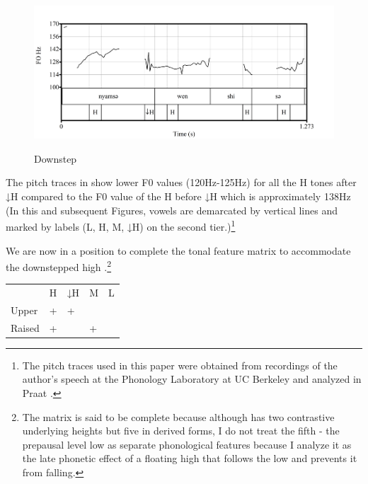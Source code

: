 \documentclass[output=paper,modfonts,nonflat,
 hidelinks
]{langsci/langscibook}
\begin{document}
\ea\label{ex:akumbu:20}
\z

\begin{figure}[t]
	{\includegraphics[width=\textwidth]{figures/fig-akumbu-1}}
	\caption{Downstep}\label{fig:akumbu:1}	
\end{figure}

\largerpage[-1]
The pitch traces in  show lower F0 values (120Hz-125Hz) for all the H tones after ↓H compared to the F0 value of the H  before ↓H which is approximately 138Hz (In this and subsequent Figures, vowels are demarcated by vertical lines and marked by  labels (L, H, M, ↓H) on the second tier.)\footnote{The pitch traces used in this paper were obtained from recordings of the author’s speech at the Phonology Laboratory at UC Berkeley and analyzed in Praat \citep{Boersma2016}.}


We are now in a position to complete the tonal feature matrix to accommodate the downstepped high .\footnote{The matrix is said to be complete because although  has two contrastive underlying  heights but five in derived forms, I do not treat the fifth - the prepausal level low  as separate phonological  features because I analyze it as the late phonetic effect of a floating high  that follows the low  and prevents it from falling.} 

\ea\label{ex:akumbu:21}
\begin{tabular}[t]{lllll}
	&			H&	↓H&	M&	L\\
	Upper&		+&	+&	\textminus&	\textminus\\
	Raised&		+&	\textminus&	+&	\textminus\\
\end{tabular}
\z
\end{document}
